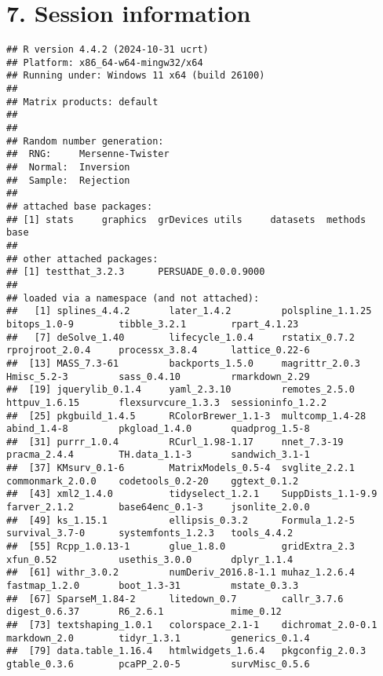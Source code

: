 \documentclass[
]{article}
\begin{document}
\clearpage

\section{7. Session information}\label{session-information}

\begin{verbatim}
## R version 4.4.2 (2024-10-31 ucrt)
## Platform: x86_64-w64-mingw32/x64
## Running under: Windows 11 x64 (build 26100)
## 
## Matrix products: default
## 
## 
## Random number generation:
##  RNG:     Mersenne-Twister 
##  Normal:  Inversion 
##  Sample:  Rejection 
##  
## attached base packages:
## [1] stats     graphics  grDevices utils     datasets  methods   base     
## 
## other attached packages:
## [1] testthat_3.2.3      PERSUADE_0.0.0.9000
## 
## loaded via a namespace (and not attached):
##   [1] splines_4.4.2       later_1.4.2         polspline_1.1.25    bitops_1.0-9        tibble_3.2.1        rpart_4.1.23       
##   [7] deSolve_1.40        lifecycle_1.0.4     rstatix_0.7.2       rprojroot_2.0.4     processx_3.8.4      lattice_0.22-6     
##  [13] MASS_7.3-61         backports_1.5.0     magrittr_2.0.3      Hmisc_5.2-3         sass_0.4.10         rmarkdown_2.29     
##  [19] jquerylib_0.1.4     yaml_2.3.10         remotes_2.5.0       httpuv_1.6.15       flexsurvcure_1.3.3  sessioninfo_1.2.2  
##  [25] pkgbuild_1.4.5      RColorBrewer_1.1-3  multcomp_1.4-28     abind_1.4-8         pkgload_1.4.0       quadprog_1.5-8     
##  [31] purrr_1.0.4         RCurl_1.98-1.17     nnet_7.3-19         pracma_2.4.4        TH.data_1.1-3       sandwich_3.1-1     
##  [37] KMsurv_0.1-6        MatrixModels_0.5-4  svglite_2.2.1       commonmark_2.0.0    codetools_0.2-20    ggtext_0.1.2       
##  [43] xml2_1.4.0          tidyselect_1.2.1    SuppDists_1.1-9.9   farver_2.1.2        base64enc_0.1-3     jsonlite_2.0.0     
##  [49] ks_1.15.1           ellipsis_0.3.2      Formula_1.2-5       survival_3.7-0      systemfonts_1.2.3   tools_4.4.2        
##  [55] Rcpp_1.0.13-1       glue_1.8.0          gridExtra_2.3       xfun_0.52           usethis_3.0.0       dplyr_1.1.4        
##  [61] withr_3.0.2         numDeriv_2016.8-1.1 muhaz_1.2.6.4       fastmap_1.2.0       boot_1.3-31         mstate_0.3.3       
##  [67] SparseM_1.84-2      litedown_0.7        callr_3.7.6         digest_0.6.37       R6_2.6.1            mime_0.12          
##  [73] textshaping_1.0.1   colorspace_2.1-1    dichromat_2.0-0.1   markdown_2.0        tidyr_1.3.1         generics_0.1.4     
##  [79] data.table_1.16.4   htmlwidgets_1.6.4   pkgconfig_2.0.3     gtable_0.3.6        pcaPP_2.0-5         survMisc_0.5.6     

\end{verbatim}
\end{document}
